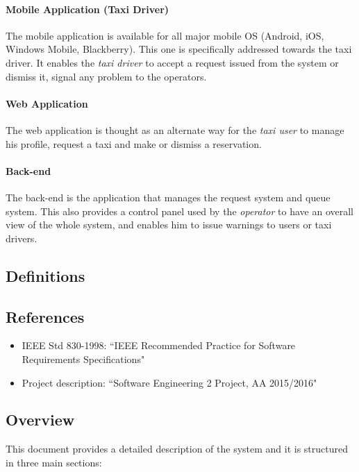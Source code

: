 \paragraph{Mobile Application (Taxi Driver)} %
  \label{app:mobiledriver}
  The mobile application is available for all major mobile OS (Android, iOS, Windows Mobile, Blackberry).
  This one is specifically addressed towards the taxi driver.
  It enables the \emph{taxi driver} to accept a request issued from the system or dismiss it, signal any problem to the operators.

\paragraph{Web Application} %
  \label{app:web}
  The web application is thought as an alternate way for the \emph{taxi user} to manage his profile, request a taxi and make or dismiss a reservation.

\paragraph{Back-end} %
  \label{app:backend}
  The back-end is the application that manages the request system and queue system. This also provides a control panel used by the \emph{operator} to have an overall view of the whole system, and enables him to issue warnings to users or taxi drivers.
\subsection{Definitions}

\subsection{References}
\begin{itemize}
\item IEEE Std 830-1998: ``IEEE Recommended Practice for Software Requirements Specifications"
\item Project description: ``Software Engineering 2 Project, AA 2015/2016"
\end{itemize}


\subsection{Overview}
This document provides a detailed description of the system and it is structured in three main sections:

